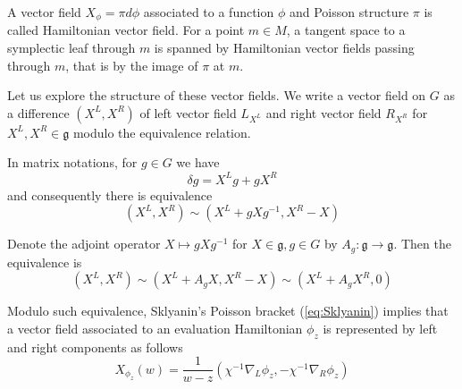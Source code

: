 \documentclass[11pt, oneside, reqno]{amsart}
\theoremstyle{definition} \newtheorem{definition}{Definition}[section]
\theoremstyle{definition} \newtheorem{remark}[definition]{Remark}
\theoremstyle{definition} \newtheorem{remarks}[definition]{Remarks}
\theoremstyle{definition} \newtheorem{question}[definition]{Question}
\theoremstyle{definition} \newtheorem*{note}{Note}
\theoremstyle{definition} \newtheorem{example}[definition]{Example}
\theoremstyle{definition} \newtheorem{examples}[definition]{Examples}
\renewcommand{\gg}{\mathfrak{g}}
\begin{document}
A vector field $X_{\phi} = \pi d \phi $ associated to a function $\phi$ and Poisson structure $\pi$ is called Hamiltonian vector field. For a point $m \in M$, a tangent space to a symplectic
leaf through $m$ is spanned by Hamiltonian vector fields passing through $m$, 
that is by the image of $\pi$ at $m$.

Let us explore the structure of these vector fields. We write a vector field on $G$
as a difference $(X^L, X^R)$  of left vector field $L_{X^L}$ and right vector field $R_{X^R}$
for $X^L, X^R \in \gg$ modulo the equivalence relation.

In matrix notations, for $g \in G$ we have
\begin{equation}
  \delta g = X^L g + g X^R 
\end{equation}
and consequently there is equivalence 
\begin{equation}
  (X^L, X^R) \sim (X^L + g X g^{-1}, X^R -  X)
\end{equation}

Denote the adjoint operator $X \mapsto g X g^{-1}$ for $X \in \gg, g \in G$ by $A_{g}: \gg \to \gg$.
Then the equivalence is
\begin{equation}
\label{eq:equivalence}
    (X^L, X^R) \sim (X^L + A_{g} X , X^{R} -  X) \sim (X^{L} +  A_{g} X^{R}, 0) 
\end{equation}


Modulo such equivalence, Sklyanin's Poisson bracket (\ref{eq:Sklyanin}) implies
that a vector field associated to an evaluation Hamiltonian $\phi_z$ is represented by
left and right components as follows 
\begin{equation}
\label{eq:Xphiz}
X_{\phi_z} (w) =  \frac{1}{w - z} ( \chi^{-1} \nabla_{L} \phi_z,  - \chi^{-1}\nabla_{R} \phi_{z})
\end{equation}
\end{document}
